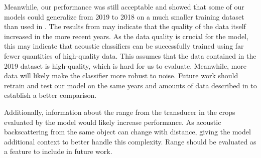     Meanwhile, our performance was still acceptable and showed that some of our models could generalize from 2019 to 2018 on a much smaller training dataset than used in \citeauthor{brautaset2020acoustic}. The results from \citeauthor{brautaset2020acoustic} may indicate that the quality of the data itself increased in the more recent years. As the data quality is crucial for the model, this may indicate that acoustic classifiers can be successfully trained using far fewer quantities of high-quality data. This assumes that the data contained in the 2019 dataset is high-quality, which is hard for us to evaluate. Meanwhile, more data will likely make the classifier more robust to noise. Future work should retrain and test our model on the same years and amounts of data described in \citeauthor{brautaset2020acoustic} to establish a better comparison.  
    
    Additionally, information about the range from the transducer in the crops evaluated by the model would likely increase performance. As acoustic backscattering from the same object can change with distance, giving the model additional context to better handle this complexity. Range should be evaluated as a feature to include in future work. 

